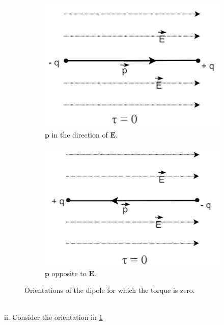 \begin{figure}[h]
    \centering
    \begin{subfigure}[b]{0.45\textwidth}
    \centering
    \includegraphics[scale = 0.6]{figures/Sandesh's Figures/dipoles1.png}
     \caption{$\bm{p}$ in the direction of $\bm{E}$.}
     \label{dp1}
    \end{subfigure}
    \hfill
     \begin{subfigure}[b]{0.45\textwidth}
     \centering
    \includegraphics[scale = 0.6]{figures/Sandesh's Figures/dipoles2.png}
     \caption{$\bm{p}$ opposite to $\bm{E}$.}
     \label{dp2}
    \end{subfigure}
    
    \caption{Orientations of the dipole for which the torque is zero.}
    \label{dipoles}
\end{figure}
\\ii. Consider the orientation in \ref{dp1}
